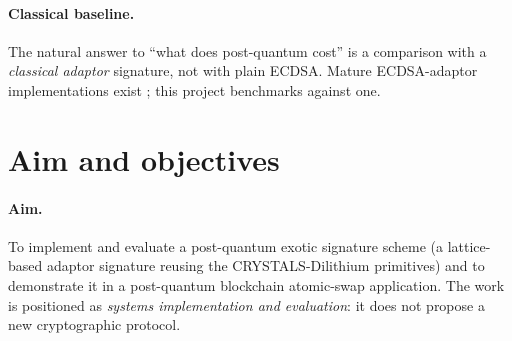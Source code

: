 \enlargethispage{\baselineskip}
\paragraph{Classical baseline.}
The natural answer to ``what does post-quantum cost'' is a comparison with a \emph{classical adaptor} signature, not with plain ECDSA. Mature ECDSA-adaptor
implementations exist \cite{secp256k1zkp}; this project benchmarks against one.

\section{Aim and objectives}
\label{sec:aims}

\paragraph{Aim.}
To implement and evaluate a post-quantum exotic signature scheme (a lattice-based
adaptor signature reusing the CRYSTALS-Dilithium primitives) and to demonstrate it
in a post-quantum blockchain atomic-swap application. The work is positioned as
\emph{systems implementation and evaluation}: it does not propose a new cryptographic
protocol.

